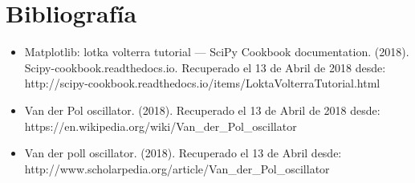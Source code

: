 \documentclass[12pt]{article}
\begin{document}
\section*{Bibliografía}
\begin{itemize}
\item Matplotlib: lotka volterra tutorial — SciPy Cookbook documentation. (2018). Scipy-cookbook.readthedocs.io. 
Recuperado el 13 de Abril de 2018 desde:\\
http://scipy-cookbook.readthedocs.io/items/LoktaVolterraTutorial.html

\item Van der Pol oscillator. (2018). Recuperado el 13 de Abril de 2018 desde:\\ https://en.wikipedia.org/wiki/Van\_der\_Pol\_oscillator

\item Van der poll oscillator. (2018). Recuperado el 13 de Abril desde: \\
http://www.scholarpedia.org/article/Van\_der\_Pol\_oscillator
\end{itemize}


\end{document}
